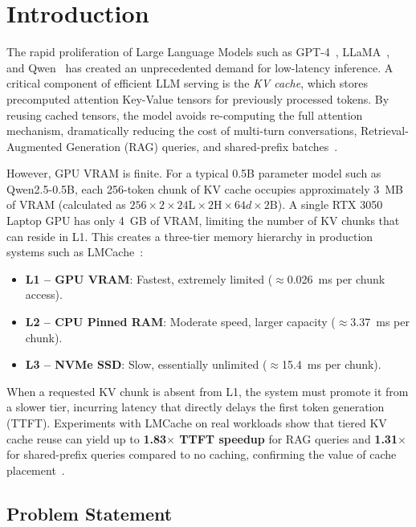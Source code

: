 \documentclass[conference]{IEEEtran}
\begin{document}
\section{Introduction}

The rapid proliferation of Large Language Models such as GPT-4~\cite{openai2023gpt4}, LLaMA~\cite{touvron2023llama}, and Qwen~\cite{bai2023qwen} has created an unprecedented demand for low-latency inference. A critical component of efficient LLM serving is the \emph{KV cache}, which stores precomputed attention Key-Value tensors for previously processed tokens. By reusing cached tensors, the model avoids re-computing the full attention mechanism, dramatically reducing the cost of multi-turn conversations, Retrieval-Augmented Generation (RAG) queries, and shared-prefix batches~\cite{kwon2023efficient}.

However, GPU VRAM is finite. For a typical 0.5B parameter model such as Qwen2.5-0.5B, each 256-token chunk of KV cache occupies approximately 3~MB of VRAM (calculated as $256 \times 2 \times 24\text{L} \times 2\text{H} \times 64d \times 2\text{B}$). A single RTX 3050 Laptop GPU has only 4~GB of VRAM, limiting the number of KV chunks that can reside in L1. This creates a three-tier memory hierarchy in production systems such as LMCache~\cite{liu2024cachegen}:

\begin{itemize}
    \item \textbf{L1 -- GPU VRAM}: Fastest, extremely limited ($\approx$0.026~ms per chunk access).
    \item \textbf{L2 -- CPU Pinned RAM}: Moderate speed, larger capacity ($\approx$3.37~ms per chunk).
    \item \textbf{L3 -- NVMe SSD}: Slow, essentially unlimited ($\approx$15.4~ms per chunk).
\end{itemize}

When a requested KV chunk is absent from L1, the system must promote it from a slower tier, incurring latency that directly delays the first token generation (TTFT). Experiments with LMCache on real workloads show that tiered KV cache reuse can yield up to \textbf{1.83$\times$ TTFT speedup} for RAG queries and \textbf{1.31$\times$} for shared-prefix queries compared to no caching, confirming the value of cache placement~\cite{liu2024cachegen}.

\subsection{Problem Statement}
\end{document}
